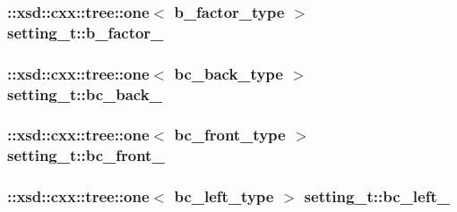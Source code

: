 \subsubsection[{\texorpdfstring{b\+\_\+factor\+\_\+}{b_factor_}}]{\setlength{\rightskip}{0pt plus 5cm}\+::xsd\+::cxx\+::tree\+::one$<$ {\bf b\+\_\+factor\+\_\+type} $>$ setting\+\_\+t\+::b\+\_\+factor\+\_\+\hspace{0.3cm}{\ttfamily [protected]}}\hypertarget{classsetting__t_a80abcacaecfeb5b1db1f4dad2588c5f1}{}\label{classsetting__t_a80abcacaecfeb5b1db1f4dad2588c5f1}
\subsubsection[{\texorpdfstring{bc\+\_\+back\+\_\+}{bc_back_}}]{\setlength{\rightskip}{0pt plus 5cm}\+::xsd\+::cxx\+::tree\+::one$<$ {\bf bc\+\_\+back\+\_\+type} $>$ setting\+\_\+t\+::bc\+\_\+back\+\_\+\hspace{0.3cm}{\ttfamily [protected]}}\hypertarget{classsetting__t_ae3f783d90c1fa59f4dea76a3c044d9f2}{}\label{classsetting__t_ae3f783d90c1fa59f4dea76a3c044d9f2}
\subsubsection[{\texorpdfstring{bc\+\_\+front\+\_\+}{bc_front_}}]{\setlength{\rightskip}{0pt plus 5cm}\+::xsd\+::cxx\+::tree\+::one$<$ {\bf bc\+\_\+front\+\_\+type} $>$ setting\+\_\+t\+::bc\+\_\+front\+\_\+\hspace{0.3cm}{\ttfamily [protected]}}\hypertarget{classsetting__t_a5eb21e4b6b8071ff01cf13b307e1a4c2}{}\label{classsetting__t_a5eb21e4b6b8071ff01cf13b307e1a4c2}
\subsubsection[{\texorpdfstring{bc\+\_\+left\+\_\+}{bc_left_}}]{\setlength{\rightskip}{0pt plus 5cm}\+::xsd\+::cxx\+::tree\+::one$<$ {\bf bc\+\_\+left\+\_\+type} $>$ setting\+\_\+t\+::bc\+\_\+left\+\_\+\hspace{0.3cm}{\ttfamily [protected]}}\hypertarget{classsetting__t_aa2093ad175216d5c95e16a0958d819ba}{}\label{classsetting__t_aa2093ad175216d5c95e16a0958d819ba}
